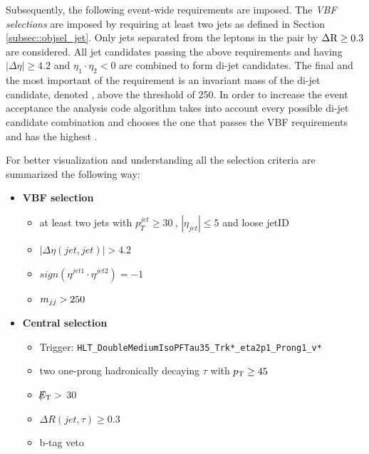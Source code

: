 Subsequently, the following event-wide requirements are imposed. The {\textit {VBF selections}} are imposed by requiring at least two jets as defined in Section \ref{subsec::objsel_jet}. Only jets separated from the leptons in the \hadtau\hadtau pair by $\Delta \text{R} \ge 0.3$ are considered. All jet candidates passing the above requirements and having $\vert \Delta\eta \vert \ge 4.2$ and $\eta_{1}\cdot\eta_{2} < 0$ are combined to form di-jet candidates. The final and the most important of the requirement is an invariant mass of the di-jet candidate, denoted \mjj, above the threshold of 250\gev. In order to increase the event acceptance the analysis code algorithm takes into account every possible di-jet candidate combination and chooses the one that passes the VBF requirements and has the highest \mjj. 

For better visualization and understanding all the selection criteria are summarized the following way:


\begin{itemize}
	\item \textbf{VBF selection}
	\begin{itemize}
		\item at least two jets with $p_{T}^{jet}\geq30~$\gev, $|\eta_{jet}|\leq5$ and loose jetID
		\item $|\Delta\eta(jet,jet)| > 4.2$
		\item $sign(\eta^{jet 1}\cdot\eta^{jet 2}) = -1$
		\item $m_{jj}>250~$\gev
	\end{itemize}
	\item \textbf{Central selection}
	\begin{itemize}
		\item Trigger: \texttt{HLT\_DoubleMediumIsoPFTau35\_Trk*\_eta2p1\_Prong1\_v*}
		\item two one-prong hadronically decaying $\tau$ with $p_{\text{T}}\geq45~$\gev 
		\item $\slash\mkern-12mu{E}_{\text{T}} > $ 30\gev
		\item $\Delta R(jet,\tau)\geq0.3$
		\item b-tag veto
	\end{itemize}
\end{itemize}



